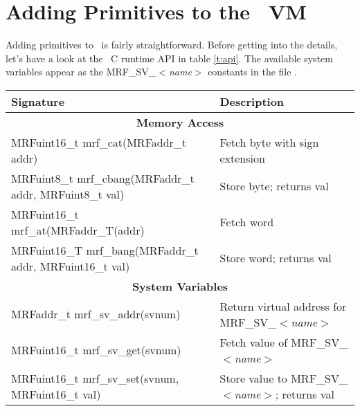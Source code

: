 \documentclass{article}
\begin{document}
\section*{Adding Primitives to the \M\ VM}

Adding primitives to \M\ is fairly straightforward. Before getting
into the details, let's have a look at the \M\ C runtime API in table
\ref{t:api}. The available system variables appear as the
MRF\_SV\_$<$\textit{name}$>$ constants in the file .
\begin{table}
\begin{center}
\begin{tabular}{|l|l|} \hline
\textbf{Signature} & \textbf{Description} \\ \hline

\multicolumn{2}{c}{\textbf{Memory Access}} \\ \hline
MRFuint16\_t mrf\_cat(MRFaddr\_t addr) &
  Fetch byte with sign extension \\ \hline
MRFuint8\_t mrf\_cbang(MRFaddr\_t addr, MRFuint8\_t val) &
  Store byte; returns val \\ \hline
MRFuint16\_t mrf\_at(MRFaddr\_T(addr) &
  Fetch word \\ \hline
MRFuint16\_T mrf\_bang(MRFaddr\_t addr, MRFuint16\_t val) &
  Store word; returns val \\ \hline

\multicolumn{2}{c}{\textbf{System Variables}} \\ \hline
MRFaddr\_t mrf\_sv\_addr(svnum) &
  Return virtual address for MRF\_SV\_$<$\textit{name}$>$ \\ \hline
MRFuint16\_t mrf\_sv\_get(svnum) &
  Fetch value of MRF\_SV\_$<$\textit{name}$>$ \\ \hline
MRFuint16\_t mrf\_sv\_set(svnum, MRFuint16\_t val) &
  Store value to MRF\_SV\_$<$\textit{name}$>$; returns val \\ \hline


\end{tabular}
\end{center}
\end{table}
\end{document}
